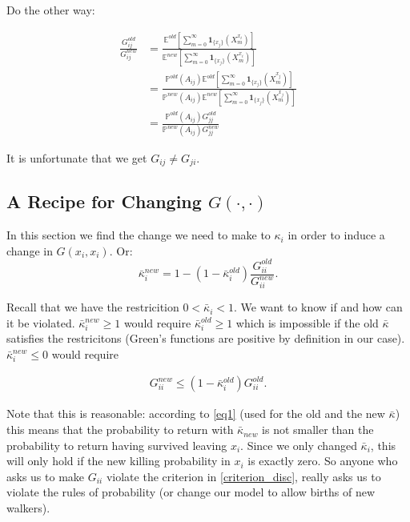 \documentclass[paper=a4, fontsize=11pt]{scrartcl} %
\numberwithin{equation}{section} %
\numberwithin{figure}{section} %
\numberwithin{table}{section} %
\begin{document}
Do the other way:

\begin{align*}
  \frac{G_{ij}^{old}}{G_{ij}^{new}} &=  \frac{ \mathbb{E}^{old} [ \sum_{m=0}^{\infty} \mathbf{1}_{ \{x_j\} }( X^{x_i}_m)] }
    { \mathbb{E}^{new} [ \sum_{m=0}^{\infty} \mathbf{1}_{ \{x_j\} }( X^{x_i}_m)] } \\
    &=  \frac{\mathbb{P}^{old} (A_{ij})\mathbb{E}^{old} [ \sum_{m=0}^{\infty} \mathbf{1}_{ \{x_j\} }( X^{x_j}_m)] }
    { \mathbb{P}^{new}(A_{ij})\mathbb{E}^{new} [ \sum_{m=0}^{\infty} \mathbf{1}_{ \{x_j\} }( X^{x_j}_m)] } \\
    &=  \frac{\mathbb{P}^{old}(A_{ij}) G_{jj}^{old} }
    { \mathbb{P}^{new}(A_{ij})G_{jj}^{new}}
\end{align*}



It is unfortunate that we get $G_{ij} \neq G_{ji}$.








\subsection{A Recipe for Changing $G(\cdot,\cdot)$}
In this section we find the change we need to make to $\kappa_{i}$ in order
to induce a change in $G(x_i,x_i)$.
Or:
$$
\bar{\kappa}^{new}_i = 1 -  (1 - \bar{\kappa}^{old}_i)\frac{G^{old}_{ii}}{G^{new}_{ii}}.
$$

Recall that we have the restricition $0 < \bar{\kappa}_i < 1$. We want to know
if and how can it be violated. $\bar{\kappa}^{new}_i \geq 1$ would require $\bar{\kappa}^{old}_i \geq 1$ which is impossible
if the old $\bar{\kappa}$ satisfies the restricitons
(Green's functions are positive by definition in our case). 
$\bar{\kappa}^{new}_i \leq 0$ would require

\begin{align}\label{criterion_disc}
G^{new}_{ii} \leq (1 - \bar{\kappa}^{old}_i)G^{old}_{ii}.
\end{align}

Note that this is reasonable: according to \eqref{eq1} (used for the old and the new $\bar{\kappa}$)
this means that the probability to return with $\bar{\kappa}_{new}$ is not smaller than the
probability to return having survived leaving $x_i$. Since we only changed $\bar{\kappa}_i$,
this will only hold if the new killing probability in $x_i$ is exactly zero. So anyone who asks 
us to make $G_{ii}$ violate the criterion in \eqref{criterion_disc}, really asks us to violate 
the rules of probability (or change our model to allow births of new walkers).
\end{document}
